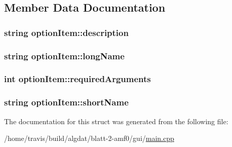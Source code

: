 \subsection{Member Data Documentation}
\hypertarget{structoption_item_af9012a5d367baa2a2caa0a53dce89a9e}{
\subsubsection[{description}]{\setlength{\rightskip}{0pt plus 5cm}string option\-Item\-::description}}\label{structoption_item_af9012a5d367baa2a2caa0a53dce89a9e}
\hypertarget{structoption_item_a296301094a37d51e451046ad95882c3a}{
\subsubsection[{long\-Name}]{\setlength{\rightskip}{0pt plus 5cm}string option\-Item\-::long\-Name}}\label{structoption_item_a296301094a37d51e451046ad95882c3a}
\hypertarget{structoption_item_abaef9292698553f86d1d7270407aef04}{
\subsubsection[{required\-Arguments}]{\setlength{\rightskip}{0pt plus 5cm}int option\-Item\-::required\-Arguments}}\label{structoption_item_abaef9292698553f86d1d7270407aef04}
\hypertarget{structoption_item_afc2e09e440800c09721ab7edffe51ff4}{
\subsubsection[{short\-Name}]{\setlength{\rightskip}{0pt plus 5cm}string option\-Item\-::short\-Name}}\label{structoption_item_afc2e09e440800c09721ab7edffe51ff4}


The documentation for this struct was generated from the following file\-:\begin{DoxyCompactItemize}
\item 
/home/travis/build/algdat/blatt-\/2-\/amf0/gui/\hyperlink{main_8cpp}{main.\-cpp}\end{DoxyCompactItemize}
